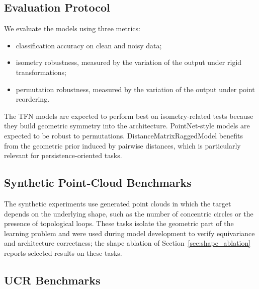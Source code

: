 \documentclass[a4paper,11pt]{article}
\begin{document}
\subsection{Evaluation Protocol}

We evaluate the models using three metrics:
\begin{itemize}
    \item classification accuracy on clean and noisy data;
    \item isometry robustness, measured by the variation of the output under rigid transformations;
    \item permutation robustness, measured by the variation of the output under point reordering.
\end{itemize}

The TFN models are expected to perform best on isometry-related tests because they build geometric symmetry into the architecture.
PointNet-style models are expected to be robust to permutations.
DistanceMatrixRaggedModel benefits from the geometric prior induced by pairwise distances, which is particularly relevant for persistence-oriented tasks.

\subsection{Synthetic Point-Cloud Benchmarks}

The synthetic experiments use generated point clouds in which the target depends on the underlying shape, such as the number of concentric circles or the presence of topological loops.
These tasks isolate the geometric part of the learning problem and were used during model development to verify equivariance and architecture correctness; the shape ablation of Section~\ref{sec:shape_ablation} reports selected results on these tasks.

\subsection{UCR Benchmarks}
\end{document}
